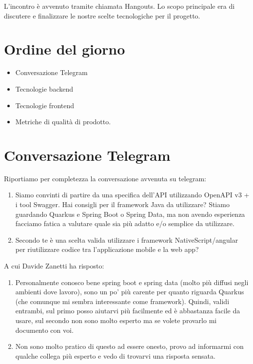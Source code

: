 \documentclass{article}
\begin{document}
L'incontro è avvenuto tramite chiamata Hangouts.
Lo scopo principale era di discutere e finalizzare le nostre scelte tecnologiche per il progetto.

\section{Ordine del giorno}%
\label{sec:ordine_del_giorno}

\begin{itemize}
  \item Conversazione Telegram
  \item Tecnologie backend
  \item Tecnologie frontend
  \item Metriche di qualità di prodotto.
\end{itemize}

\section{Conversazione Telegram}%
\label{sec:conversazione_telegram}

Riportiamo per completezza la conversazione avvenuta su telegram:

\begin{enumerate}
  \item Siamo convinti di partire da una specifica dell'API utilizzando OpenAPI v3 + i tool Swagger.
        Hai consigli per il framework Java da utilizzare? Stiamo guardando Quarkus e Spring Boot o Spring Data, ma non avendo esperienza facciamo fatica a valutare quale sia più adatto e/o semplice da utilizzare.
  \item Secondo te è una scelta valida utilizzare i framework NativeScript/angular per riutilizzare codice tra l'applicazione mobile e la web app?
\end{enumerate}

A cui Davide Zanetti ha risposto:

\begin{enumerate}
  \item Personalmente conosco bene spring boot e spring data (molto più diffusi negli ambienti dove lavoro), sono un po' più carente per quanto riguarda Quarkus (che comunque mi sembra interessante come framework).
        Quindi, validi entrambi, sul primo posso aiutarvi più facilmente ed è abbastanza facile da usare, sul secondo non sono molto esperto ma se volete provarlo mi documento con voi.
  \item Non sono molto pratico di questo ad essere onesto, provo ad informarmi con qualche collega più esperto e vedo di trovarvi una risposta sensata.
\end{enumerate}
\end{document}
